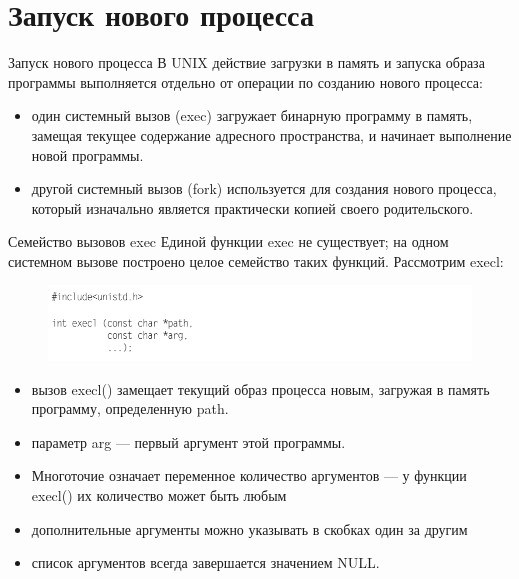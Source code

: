 \documentclass{beamer}
\begin{document}
\section{Запуск нового процесса}

\begin{frame}{Запуск нового процесса}
В UNIX действие загрузки в память и запуска образа программы выполняется
отдельно от операции по созданию нового процесса:
\begin{itemize}
\item один системный вызов (exec) загружает бинарную программу в память, замещая текущее содержание адресного пространства, и начинает выполнение новой программы. 
\item другой системный вызов (fork) используется для создания нового процесса, который изначально является практически копией своего родительского.
\end{itemize}
\end{frame}

\begin{frame}{Семейство вызовов exec}
Единой функции exec не существует; на одном системном вызове построено целое
семейство таких функций. Рассмотрим execl:
\begin{figure}[h]
\centering
\includegraphics[scale=0.5]{images/lec07-pic04.png}
\end{figure}
\begin{itemize}
\item вызов execl() замещает текущий образ процесса новым, загружая в память
программу, определенную path. 
\item параметр arg — первый аргумент этой программы. 
\item Многоточие означает переменное количество аргументов — у функции
execl() их количество может быть любым
\item дополнительные аргументы можно указывать в скобках один за другим
\item список аргументов всегда завершается значением NULL.
\end{itemize}
\end{frame}
\end{document}
